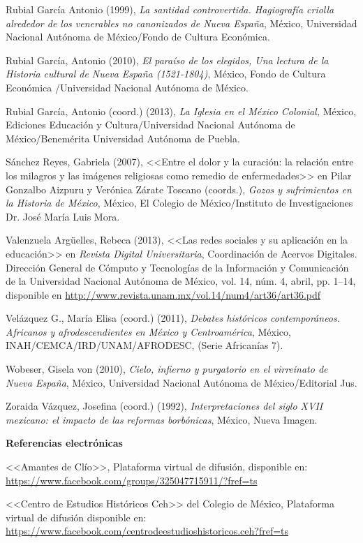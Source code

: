 Rubial García Antonio (1999), \textit{La santidad controvertida. Hagiografía
criolla alrededor de los venerables no canonizados de Nueva España}, México,
Universidad Nacional Autónoma de México\slash{}Fondo de Cultura Económica.


Rubial García, Antonio (2010), \textit{El paraíso de los elegidos, Una lectura
de la Historia cultural de Nueva España (1521-1804)}, México, Fondo de Cultura
Económica /Universidad Nacional Autónoma de México.


Rubial García, Antonio (coord.) (2013), \textit{La Iglesia en el México
Colonial,} México, Ediciones Educación y Cultura\slash{}Universidad Nacional
Autónoma de México\slash{}Benemérita Universidad Autónoma de Puebla.


Sánchez Reyes, Gabriela (2007), <<Entre el dolor y la curación: la relación entre
los milagros y las imágenes religiosas como remedio de enfermedades>> en Pilar
Gonzalbo Aizpuru y Verónica Zárate Toscano (coords.), \textit{Gozos y
sufrimientos en la Historia de México}, México, El Colegio de México\slash{}Instituto de Investigaciones Dr. José María Luis Mora.


Valenzuela Argüelles, Rebeca (2013), <<Las redes sociales y su aplicación en la
educación>> en \textit{Revista Digital Universitaria}, Coordinación de Acervos
Digitales. Dirección General de Cómputo y Tecnologías de la Información y
Comunicación de la Universidad Nacional Autónoma de México, vol. 14, núm. 4,
abril, pp. 1--14,  disponible en 
\url{http://www.revista.unam.mx/vol.14/num4/art36/art36.pdf}


Velázquez G., María Elisa (coord.) (2011), \textit{ Debates históricos
contemporáneos. Africanos y afrodescendientes  en México y Centroamérica}, México, INAH/CEMCA/IRD/UNAM/AFRODESC,  (Serie Africanías 7).


Wobeser, Gisela von (2010), \textit{Cielo, infierno y purgatorio en el
virreinato de Nueva España}, México, Universidad Nacional Autónoma de México\slash{}Editorial Jus.


Zoraida Vázquez, Josefina (coord.) (1992), \textit{Interpretaciones del siglo
XVII mexicano: el impacto de las reformas borbónicas}, México, Nueva Imagen.


\bigskip
\textbf{Referencias electrónicas}


<<Amantes de Clío>>, Plataforma virtual de difusión, disponible en:
\url{https://www.facebook.com/groups/325047715911/?fref=ts}


<<Centro de Estudios Históricos Ceh>> del Colegio de México, Plataforma virtual de difusión
disponible en: \url{https://www.facebook.com/centrodeestudioshistoricos.ceh?fref=ts}

